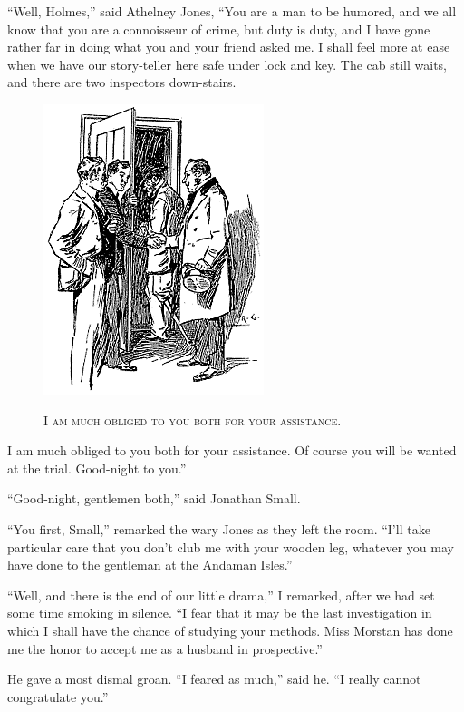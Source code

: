 \documentclass[12pt,english,oneside]{book}
\newcommand{\noun}[1]{\textsc{#1}}
\begin{document}
{}``Well, Holmes,'' said Athelney Jones, {}``You are a man to be
humored, and we all know that you are a connoisseur of crime, but
duty is duty, and I have gone rather far in doing what you and your
friend asked me. I shall feel more at ease when we have our story-teller
here safe under lock and key. The cab still waits, and there are two
inspectors down-stairs. %
\begin{figure}[htbp]
\noindent \begin{center}\includegraphics{images/sign410-sign-24.png}\end{center}

\noindent \begin{center}\noun{I am much obliged to you both for
your assistance.}\end{center}
\end{figure}
I am much obliged to you both for your assistance. Of course you will
be wanted at the trial. Good-night to you.''

{}``Good-night, gentlemen both,'' said Jon\-a\-than Small.

{}``You first, Small,'' remarked the wary Jones as they left the
room. {}``I'll take particular care that you don't club me with your
wooden leg, whatever you may have done to the gentleman at the Andaman
Isles.''

{}``Well, and there is the end of our little drama,'' I remarked,
after we had set some time smoking in silence. {}``I fear that it
may be the last investigation in which I shall have the chance of
studying your methods. Miss Morstan has done me the honor to accept
me as a husband in prospective.''

He gave a most dismal groan. {}``I feared as much,'' said he. {}``I
really cannot congratulate you.''
\end{document}
